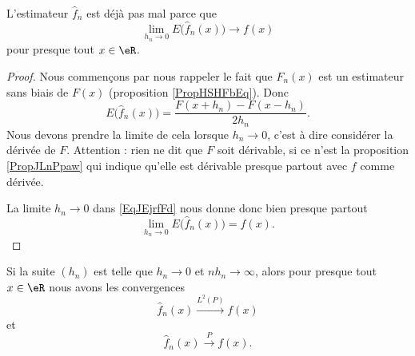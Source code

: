 \begin{lemma}   \label{LemTZopXDd}
    L'estimateur \( \hat f_n\) est déjà pas mal parce que
    \begin{equation}
        \lim_{h_n\to 0} E\big( \hat f_n(x) \big)\to f(x)
    \end{equation}
    pour presque tout \( x\in \eR\).
\end{lemma}

\begin{proof}
    Nous commençons par nous rappeler le fait que \( F_n(x)\) est un estimateur sans biais de \( F(x)\) (proposition \ref{PropHSHFbEq}). Donc
    \begin{equation}    \label{EqJEjrfFd}
        E\big( \hat f_n(x) \big)=\frac{ F(x+h_n)-F(x-h_n) }{ 2h_n }.
    \end{equation}
    Nous devons prendre la limite de cela lorsque \( h_n\to 0\), c'est à dire considérer la dérivée de \( F\). Attention : rien ne dit que \( F\) soit dérivable, si ce n'est la proposition \ref{PropJLnPpaw} qui indique qu'elle est dérivable presque partout avec \( f\) comme dérivée.

    La limite \( h_n\to 0\) dans \eqref{EqJEjrfFd} nous donne donc bien presque partout
    \begin{equation}
        \lim_{h_n\to 0} E\big( \hat f_n(x) \big)=f(x).
    \end{equation}
\end{proof}

\begin{proposition}
    Si la suite \( (h_n)\) est telle que \( h_n\to 0\) et \( nh_n\to \infty\), alors pour presque tout \( x\in \eR\) nous avons les convergences
    \begin{equation}
        \hat f_n(x)\stackrel{L^2(P)}{\to}f(x)
    \end{equation}
    et
    \begin{equation}
        \hat f_n(x)\stackrel{P}{\to}f(x).
    \end{equation}
\end{proposition}

